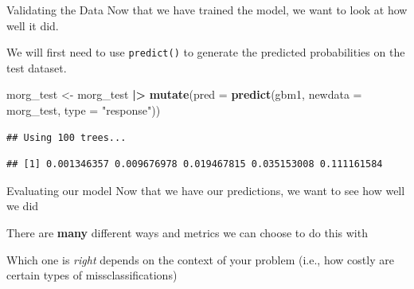 \documentclass[
  ignorenonframetext,
]{beamer}
\newenvironment{Shaded}{\begin{snugshade}}{\end{snugshade}}
\newcommand{\AttributeTok}[1]{\textcolor[rgb]{0.13,0.29,0.53}{#1}}
\newcommand{\FunctionTok}[1]{\textcolor[rgb]{0.13,0.29,0.53}{\textbf{#1}}}
\newcommand{\NormalTok}[1]{#1}
\newcommand{\OtherTok}[1]{\textcolor[rgb]{0.56,0.35,0.01}{#1}}
\newcommand{\SpecialCharTok}[1]{\textcolor[rgb]{0.81,0.36,0.00}{\textbf{#1}}}
\newcommand{\StringTok}[1]{\textcolor[rgb]{0.31,0.60,0.02}{#1}}
\begin{document}
\begin{frame}[fragile]{Validating the Data}
\label{validating-the-data}
Now that we have trained the model, we want to look at how well it did.

We will first need to use \texttt{predict()} to generate the predicted
probabilities on the test dataset.

\scriptsize

\begin{Shaded}
\begin{Highlighting}[]
\NormalTok{morg\_test }\OtherTok{\textless{}{-}}\NormalTok{ morg\_test }\SpecialCharTok{|\textgreater{}}
  \FunctionTok{mutate}\NormalTok{(}\AttributeTok{pred =} \FunctionTok{predict}\NormalTok{(gbm1, }\AttributeTok{newdata =}\NormalTok{ morg\_test, }\AttributeTok{type =} \StringTok{"response"}\NormalTok{))}
\end{Highlighting}
\end{Shaded}

\begin{verbatim}
## Using 100 trees...
\end{verbatim}

\begin{Shaded}
\end{Shaded}

\begin{verbatim}
## [1] 0.001346357 0.009676978 0.019467815 0.035153008 0.111161584
\end{verbatim}
\end{frame}

\begin{frame}{Evaluating our model}
\label{evaluating-our-model}
Now that we have our predictions, we want to see how well we did

There are \textbf{many} different ways and metrics we can choose to do
this with

Which one is \emph{right} depends on the context of your problem (i.e.,
how costly are certain types of missclassifications)
\end{frame}
\end{document}
